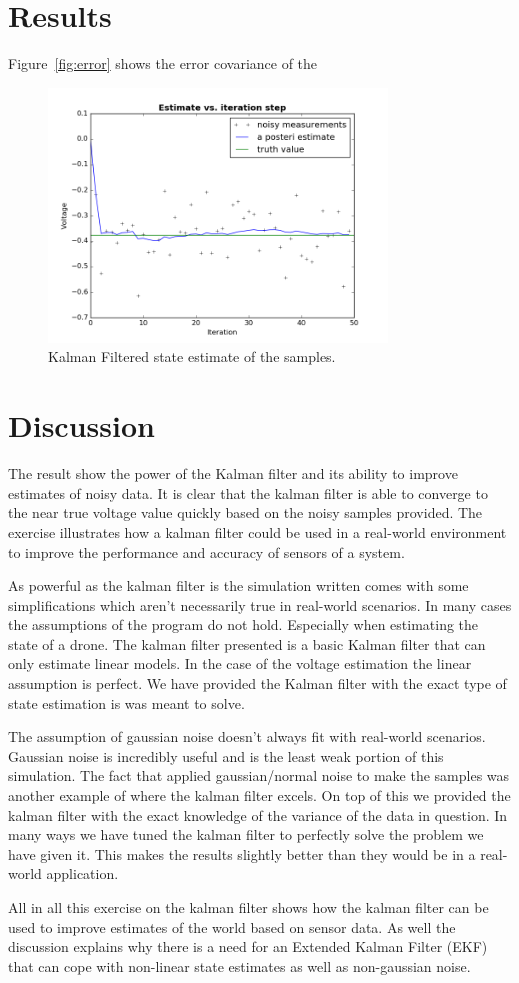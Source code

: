 \documentclass[letter]{IEEEtran}
\begin{document}
\section{Results}
Figure~\ref{fig:error} shows the error covariance of the 
\begin{figure}[!tbhp]
\centering
\includegraphics[width=9cm]{estimate_small}
\caption{Kalman Filtered state estimate of the samples.}
\label{fig:estimate}
\end{figure}

\section{Discussion}
The result show the power of the Kalman filter and its ability to improve estimates of noisy data. It is clear that the kalman filter is able to converge to the near true voltage value quickly based on the noisy samples provided. The exercise illustrates how a kalman filter could be used in a real-world environment to improve the performance and accuracy of sensors of a system.

As powerful as the kalman filter is the simulation written comes with some simplifications which aren't necessarily true in real-world scenarios. In many cases the assumptions of the program do not hold. Especially when estimating the state of a drone. The kalman filter presented is a basic Kalman filter that can only estimate linear models. In the case of the voltage estimation the linear assumption is perfect. We have provided the Kalman filter with the exact type of state estimation is was meant to solve.

The assumption of gaussian noise doesn't always fit with real-world scenarios. Gaussian noise is incredibly useful and is the least weak portion of this simulation. The fact that applied gaussian/normal noise to make the samples was another example of where the kalman filter excels. On top of this we provided the kalman filter with the exact knowledge of the variance of the data in question. In many ways we have tuned the kalman filter to perfectly solve the problem we have given it. This makes the results slightly better than they would be in a real-world application.

All in all this exercise on the kalman filter shows how the kalman filter can be used to improve estimates of the world based on sensor data. As well the discussion explains why there is a need for an Extended Kalman Filter (EKF) that can cope with non-linear state estimates as well as non-gaussian noise.
\end{document}
